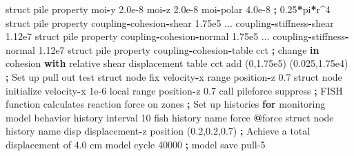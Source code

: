 \documentclass[a4paper, nobind]{templates/ociamthesis}
\newenvironment{Shaded}{\begin{snugshade}}{\end{snugshade}}
\newcommand{\BuiltInTok}[1]{#1}
\newcommand{\ControlFlowTok}[1]{\textcolor[rgb]{0.13,0.29,0.53}{\textbf{#1}}}
\newcommand{\DecValTok}[1]{\textcolor[rgb]{0.00,0.00,0.81}{#1}}
\newcommand{\FloatTok}[1]{\textcolor[rgb]{0.00,0.00,0.81}{#1}}
\newcommand{\KeywordTok}[1]{\textcolor[rgb]{0.13,0.29,0.53}{\textbf{#1}}}
\newcommand{\NormalTok}[1]{#1}
\newcommand{\OperatorTok}[1]{\textcolor[rgb]{0.81,0.36,0.00}{\textbf{#1}}}
\newcommand{\StringTok}[1]{\textcolor[rgb]{0.31,0.60,0.02}{#1}}
\renewenvironment{Shaded}
{
  \vspace{10pt}%
  \begin{snugshade}%
}{%
  \end{snugshade}%
  \vspace{8pt}%
}
\begin{document}
\begin{Shaded}
\begin{Highlighting}[]
\NormalTok{    struct pile }\BuiltInTok{property}\NormalTok{ moi}\OperatorTok{{-}}\NormalTok{y }\FloatTok{2.0e{-}8}\NormalTok{ moi}\OperatorTok{{-}}\NormalTok{z }\FloatTok{2.0e{-}8}\NormalTok{ moi}\OperatorTok{{-}}\NormalTok{polar }\FloatTok{4.0e{-}8} \OperatorTok{;} \FloatTok{0.25}\OperatorTok{*}\NormalTok{pi}\OperatorTok{*}\NormalTok{r}\OperatorTok{\^{}}\DecValTok{4}
\NormalTok{    struct pile }\BuiltInTok{property}\NormalTok{ coupling}\OperatorTok{{-}}\NormalTok{cohesion}\OperatorTok{{-}}\NormalTok{shear }\FloatTok{1.75e5}\NormalTok{ ...}
\NormalTok{                         coupling}\OperatorTok{{-}}\NormalTok{stiffness}\OperatorTok{{-}}\NormalTok{shear }\FloatTok{1.12e7}
\NormalTok{    struct pile }\BuiltInTok{property}\NormalTok{ coupling}\OperatorTok{{-}}\NormalTok{cohesion}\OperatorTok{{-}}\NormalTok{normal }\FloatTok{1.75e5}\NormalTok{ ...}
\NormalTok{                         coupling}\OperatorTok{{-}}\NormalTok{stiffness}\OperatorTok{{-}}\NormalTok{normal }\FloatTok{1.12e7}
\NormalTok{    struct pile }\BuiltInTok{property}\NormalTok{ coupling}\OperatorTok{{-}}\NormalTok{cohesion}\OperatorTok{{-}}\NormalTok{table }\StringTok{\textquotesingle{}cct\textquotesingle{}}
    \OperatorTok{;}\NormalTok{ change }\KeywordTok{in}\NormalTok{ cohesion }\ControlFlowTok{with}\NormalTok{ relative shear displacement}
\NormalTok{    table }\StringTok{\textquotesingle{}cct\textquotesingle{}}\NormalTok{ add (}\DecValTok{0}\NormalTok{,}\FloatTok{1.75e5}\NormalTok{) (}\FloatTok{0.025}\NormalTok{,}\FloatTok{1.75e4}\NormalTok{)}
    \OperatorTok{;}\NormalTok{ Set up pull out test}
\NormalTok{    struct node fix velocity}\OperatorTok{{-}}\NormalTok{x }\BuiltInTok{range}\NormalTok{ position}\OperatorTok{{-}}\NormalTok{z }\FloatTok{0.7}
\NormalTok{    struct node initialize velocity}\OperatorTok{{-}}\NormalTok{x }\FloatTok{1e{-}6}\NormalTok{ local }\BuiltInTok{range}\NormalTok{ position}\OperatorTok{{-}}\NormalTok{z }\FloatTok{0.7}
\NormalTok{    call }\StringTok{\textquotesingle{}pileforce\textquotesingle{}}\NormalTok{ suppress }\OperatorTok{;}\NormalTok{ FISH function calculates reaction force on zones}
    \OperatorTok{;}\NormalTok{ Set up histories }\ControlFlowTok{for}\NormalTok{ monitoring model behavior}
\NormalTok{    history interval }\DecValTok{10}
\NormalTok{    fish history name }\StringTok{\textquotesingle{}force\textquotesingle{}} \OperatorTok{@}\NormalTok{force}
\NormalTok{    struct node history name }\StringTok{\textquotesingle{}disp\textquotesingle{}}\NormalTok{ displacement}\OperatorTok{{-}}\NormalTok{z position (}\FloatTok{0.2}\NormalTok{,}\FloatTok{0.2}\NormalTok{,}\FloatTok{0.7}\NormalTok{)}
    \OperatorTok{;}\NormalTok{ Achieve a total displacement of }\FloatTok{4.0}\NormalTok{ cm}
\NormalTok{    model cycle }\DecValTok{40000}
    \OperatorTok{;}
\NormalTok{    model save }\StringTok{\textquotesingle{}pull{-}5\textquotesingle{}}


\end{Highlighting}
\end{Shaded}
\end{document}
